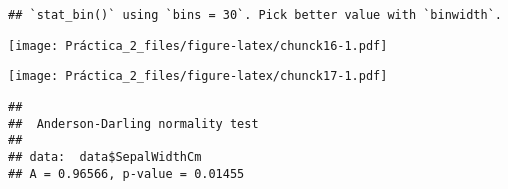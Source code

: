 \documentclass[
]{article}
\newenvironment{Shaded}{\begin{snugshade}}{\end{snugshade}}
\newcommand{\AttributeTok}[1]{\textcolor[rgb]{0.77,0.63,0.00}{#1}}
\newcommand{\CommentTok}[1]{\textcolor[rgb]{0.56,0.35,0.01}{\textit{#1}}}
\newcommand{\FunctionTok}[1]{\textcolor[rgb]{0.00,0.00,0.00}{#1}}
\newcommand{\NormalTok}[1]{#1}
\newcommand{\SpecialCharTok}[1]{\textcolor[rgb]{0.00,0.00,0.00}{#1}}
\begin{document}
\begin{verbatim}
## `stat_bin()` using `bins = 30`. Pick better value with `binwidth`.
\end{verbatim}

\texttt{[image: Práctica\_2\_files/figure-latex/chunck16-1.pdf]}

\begin{Shaded}
\end{Shaded}

\texttt{[image: Práctica\_2\_files/figure-latex/chunck17-1.pdf]}

\begin{Shaded}
\end{Shaded}

\begin{verbatim}
## 
##  Anderson-Darling normality test
## 
## data:  data$SepalWidthCm
## A = 0.96566, p-value = 0.01455
\end{verbatim}
\end{document}
